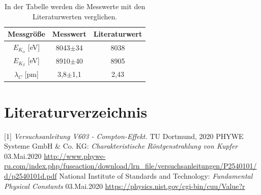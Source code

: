 \documentclass[titlepage = firstcover]{scrartcl}
\begin{document}
        \begin{table}[h]
            \centering
            \caption{In der Tabelle werden die Messwerte mit den Literaturwerten verglichen.}
            
            \begin{tabular}{c c c }
                \toprule
                {Messgröße} & {Messwert} & {Literaturwert} \\
                \midrule
                $E_{K_{\alpha}}$ [eV]& 8043$\pm$34 & 8038 \\
                $E_{K_{\beta}}$  [eV]& 8910$\pm$40 & 8905 \\
                $\lambda_C$      [pm]& 3,8$\pm$1,1 & 2,43 \\
                \bottomrule
            \end{tabular}
        \end{table}

    \newpage
    \section{Literaturverzeichnis}
            [1] \textit{Versuchsanleitung V603 - Compton-Effekt.} TU Dortmund, 2020 \newline
            [2] PHYWE Systeme GmbH \& Co. KG: \textit{Charakteristische Röntgenstrahlung von Kupfer} 03.Mai.2020
                \url{http://www.phywe-ru.com/index.php/fuseaction/download/lrn_file/versuchsanleitungen/P2540101/d/p2540101d.pdf} \newline
            [3] National Institute of Standards and Technology: \textit{Fundamental Physical Constants} 03.Mai.2020
                \url{https://physics.nist.gov/cgi-bin/cuu/Value?r}

    \newpage
    
\end{document}

